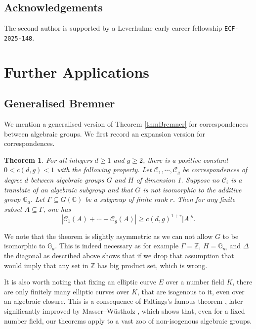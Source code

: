 \documentclass[12pt, reqno]{amsart}
\newtheorem{thm}[theorem]{Theorem}
\theoremstyle{remark}
\theoremstyle{definition}
\numberwithin{equation}{section}
\begin{document}
\subsection*{Acknowledgements}  The second author is supported by a Leverhulme early career fellowship \texttt{ECF-2025-148}.

\section{Further Applications} \label{furtherapp}





\subsection{Generalised Bremner}
We mention a generalised version of Theorem \ref{thmBremner} for correspondences between algebraic groups. We first record an expansion version for correspondences.  

\begin{thm} \label{rankversion}
For all integers $d \geq 1$ and $g \geq 2$, there is a positive constant $0 < c(d,g) <1$ with the following property.
Let $\mathcal{C}_1, \cdots, \mathcal{C}_g$ be correspondences  of degree $d$ between algebraic groups $G$ and $H$ of dimension 1. Suppose no $\mathcal{C}_i$ is a translate of an algebraic subgroup and that $G$ is not isomorphic to the additive group $\mathbb{G}_a$. Let $\Gamma \subseteq G(\mathbb{C}) $ be a subgroup of finite rank $r$. Then for any finite subset $A\subseteq \Gamma$, one has
$$|\mathcal{C}_1(A) + \cdots + \mathcal{C}_g(A)|\geq c(d,g)^{1 + r} |A|^{g}.$$
\end{thm}
 We note that the theorem is slightly asymmetric as we can not allow $G$ to be isomorphic to $\mathbb{G}_a$. This is indeed necessary as for example $\Gamma = \mathbb{Z}$, $H = \mathbb{G}_m$ and $\Delta$ the diagonal as described above shows that if we drop that assumption that would imply that any set in $\mathbb{Z}$ has big product set, which is wrong. 

 
It is also worth noting that fixing an elliptic curve $E$ over a number field $K$, there are only finitely many elliptic curves over $K$, that are isogenous to it, even over an algebraic closure. This is a consequence of Faltings's famous theorem \cite{Faltings}, later significantly improved by Masser--Wüstholz \cite{MWelliptic}, which shows that, even for a fixed number field, our theorems apply to a vast zoo of non-isogenous algebraic  groups. 
\end{document}
